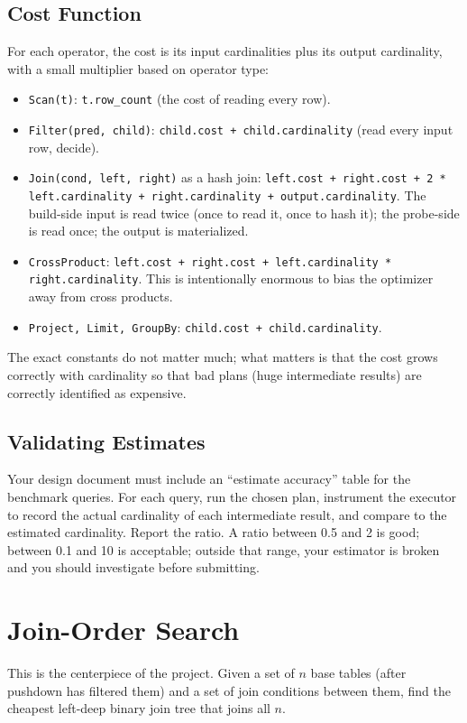 \documentclass[11pt,a4paper]{article}
\begin{document}
\subsection{Cost Function}
For each operator, the cost is its input cardinalities plus its output cardinality, with a small multiplier based on operator type:

\begin{itemize}
\item \texttt{Scan(t)}: \texttt{t.row\_count} (the cost of reading every row).
\item \texttt{Filter(pred, child)}: \texttt{child.cost + child.cardinality} (read every input row, decide).
\item \texttt{Join(cond, left, right)} as a hash join: \texttt{left.cost + right.cost + 2 * left.cardinality + right.cardinality + output.cardinality}. The build-side input is read twice (once to read it, once to hash it); the probe-side is read once; the output is materialized.
\item \texttt{CrossProduct}: \texttt{left.cost + right.cost + left.cardinality * right.cardinality}. This is intentionally enormous to bias the optimizer away from cross products.
\item \texttt{Project, Limit, GroupBy}: \texttt{child.cost + child.cardinality}.
\end{itemize}

The exact constants do not matter much; what matters is that the cost grows correctly with cardinality so that bad plans (huge intermediate results) are correctly identified as expensive.

\subsection{Validating Estimates}
Your design document must include an ``estimate accuracy'' table for the benchmark queries. For each query, run the chosen plan, instrument the executor to record the actual cardinality of each intermediate result, and compare to the estimated cardinality. Report the ratio. A ratio between 0.5 and 2 is good; between 0.1 and 10 is acceptable; outside that range, your estimator is broken and you should investigate before submitting.

\section{Join-Order Search}

This is the centerpiece of the project. Given a set of $n$ base tables (after pushdown has filtered them) and a set of join conditions between them, find the cheapest left-deep binary join tree that joins all $n$.
\end{document}
